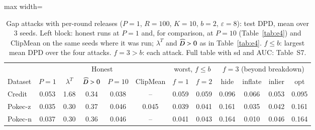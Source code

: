 \begin{table}[tbp]
\centering
\scriptsize
\setlength{\tabcolsep}{3pt}
\caption{Gap attacks with per-round releases ($P=1$, $R=100$, $K=10$, $b=2$, $\varepsilon=8$): test DPD, mean over 3 seeds. Left block: honest runs at $P=1$ and, for comparison, at $P=10$ (Table~\ref{tab:e4}) and ClipMean on the same seeds where it was run; $\lambda^T$ and $\widehat{D}>0$ as in Table~\ref{tab:e4}. $f\le b$: largest mean DPD over the four attacks. $f=3>b$: each attack. Full table with sd and AUC: Table~S7.}
\label{tab:e8}
\begin{adjustbox}{max width=\textwidth}
\begin{tabular}{lccccc|cc|cccc}
\toprule
 & \multicolumn{5}{c|}{Honest} & \multicolumn{2}{c|}{worst, $f\le b$} & \multicolumn{4}{c}{$f=3$ (beyond breakdown)} \\
Dataset & $P=1$ & $\lambda^T$ & $\widehat{D}>0$ & $P=10$ & ClipMean & $f=1$ & $f=2$ & hide & inflate & inlier & opt \\
\midrule
Credit & 0.053 & 1.68 & 0.34 & 0.038 & -- & 0.059 & 0.059 & 0.096 & 0.066 & 0.053 & 0.095 \\
Pokec-z & 0.035 & 0.30 & 0.37 & 0.046 & 0.045 & 0.039 & 0.041 & 0.161 & 0.035 & 0.042 & 0.161 \\
Pokec-n & 0.037 & 0.30 & 0.36 & 0.046 & -- & 0.041 & 0.043 & 0.164 & 0.010 & 0.046 & 0.164 \\
\bottomrule
\end{tabular}
\end{adjustbox}
\end{table}
